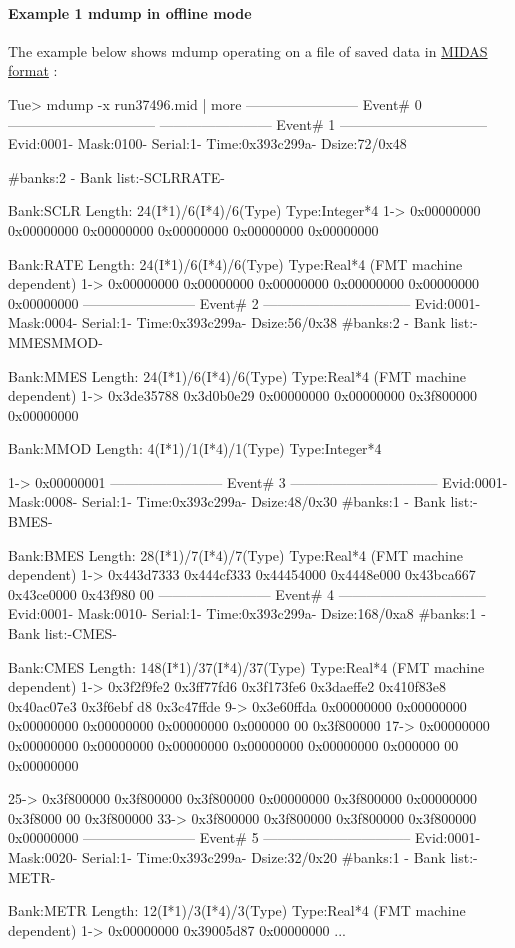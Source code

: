 \par
 \hypertarget{RC_Monitor_RC_mdump_ex1}{}\paragraph{Example 1 mdump in offline mode}\label{RC_Monitor_RC_mdump_ex1}
The example below shows mdump operating on a file of saved data in \hyperlink{FE_Data_format_FE_Midas_format}{MIDAS format} : 
\begin{DoxyCode}
Tue> mdump -x run37496.mid | more
------------------------ Event# 0 --------------------------------
------------------------ Event# 1 --------------------------------
Evid:0001- Mask:0100- Serial:1- Time:0x393c299a- Dsize:72/0x48

#banks:2 - Bank list:-SCLRRATE-

Bank:SCLR Length: 24(I*1)/6(I*4)/6(Type) Type:Integer*4
   1-> 0x00000000 0x00000000 0x00000000 0x00000000 0x00000000 0x00000000 

Bank:RATE Length: 24(I*1)/6(I*4)/6(Type) Type:Real*4 (FMT machine dependent)
   1-> 0x00000000 0x00000000 0x00000000 0x00000000 0x00000000 0x00000000 
------------------------ Event# 2 --------------------------------
Evid:0001- Mask:0004- Serial:1- Time:0x393c299a- Dsize:56/0x38
#banks:2 - Bank list:-MMESMMOD-

Bank:MMES Length: 24(I*1)/6(I*4)/6(Type) Type:Real*4 (FMT machine dependent)
   1-> 0x3de35788 0x3d0b0e29 0x00000000 0x00000000 0x3f800000 0x00000000 

Bank:MMOD Length: 4(I*1)/1(I*4)/1(Type) Type:Integer*4


   1-> 0x00000001 
------------------------ Event# 3 --------------------------------
Evid:0001- Mask:0008- Serial:1- Time:0x393c299a- Dsize:48/0x30
#banks:1 - Bank list:-BMES-

Bank:BMES Length: 28(I*1)/7(I*4)/7(Type) Type:Real*4 (FMT machine dependent)
   1-> 0x443d7333 0x444cf333 0x44454000 0x4448e000 0x43bca667 0x43ce0000 0x43f980
      00 
------------------------ Event# 4 --------------------------------
Evid:0001- Mask:0010- Serial:1- Time:0x393c299a- Dsize:168/0xa8
#banks:1 - Bank list:-CMES-

Bank:CMES Length: 148(I*1)/37(I*4)/37(Type) Type:Real*4 (FMT machine dependent)
   1-> 0x3f2f9fe2 0x3ff77fd6 0x3f173fe6 0x3daeffe2 0x410f83e8 0x40ac07e3 0x3f6ebf
      d8 0x3c47ffde 
   9-> 0x3e60ffda 0x00000000 0x00000000 0x00000000 0x00000000 0x00000000 0x000000
      00 0x3f800000 
  17-> 0x00000000 0x00000000 0x00000000 0x00000000 0x00000000 0x00000000 0x000000
      00 0x00000000 

  25-> 0x3f800000 0x3f800000 0x3f800000 0x00000000 0x3f800000 0x00000000 0x3f8000
      00 0x3f800000 
  33-> 0x3f800000 0x3f800000 0x3f800000 0x3f800000 0x00000000 
------------------------ Event# 5 --------------------------------
Evid:0001- Mask:0020- Serial:1- Time:0x393c299a- Dsize:32/0x20
#banks:1 - Bank list:-METR-

Bank:METR Length: 12(I*1)/3(I*4)/3(Type) Type:Real*4 (FMT machine dependent)
   1-> 0x00000000 0x39005d87 0x00000000 
...
\end{DoxyCode}


